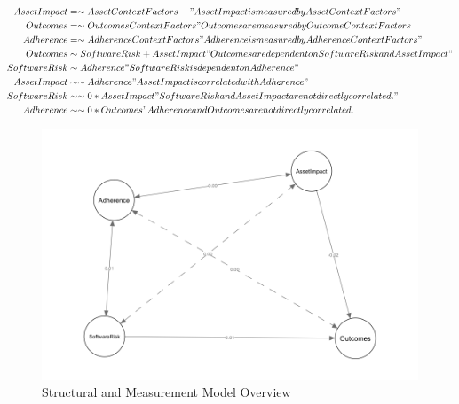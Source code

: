 \begin{equation} \label{eq:1}
 \begin{split}
 AssetImpact &=\sim AssetContextFactors 
        - "Asset Impact is measured by Asset Context Factors"\\
 Outcomes &=\sim OutcomesContextFactors "Outcomes are measured by Outcome Context Factors\\ 
 Adherence &=\sim AdherenceContextFactors "Adherence is measured by Adherence Context Factors"\\
 Outcomes &\sim SoftwareRisk + AssetImpact "Outcomes are dependent on Software Risk and Asset Impact"\\
 SoftwareRisk &\sim Adherence "Software Risk is dependent on Adherence"\\
 AssetImpact &\sim\sim  Adherence "Asset Impact is correlated with Adherence"\\
 SoftwareRisk &\sim\sim 0*AssetImpact "Software Risk and Asset Impact are not directly correlated."\\
 Adherence &\sim\sim 0*Outcomes "Adherence and Outcomes are not directly correlated.\\
 \end{split}
 \end{equation}
 
 \begin{figure}
 	\includegraphics[width=\columnwidth]{modelzeroB.png}
 	\caption{Structural and Measurement Model Overview}
 	\label{fig:model_constructs}
 \end{figure}
  
